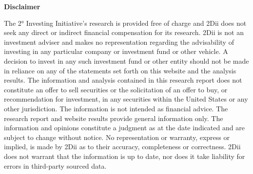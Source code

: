 \documentclass[10pt,table,a4]{article}\usepackage[]{graphicx}\usepackage[]{color}
\begin{document}
\begin{multicols}{2}
		\textbf{Disclaimer}
		
		The 2° Investing Initiative’s research is provided free of charge and 2Dii does not seek any direct or indirect financial compensation for its research. 2Dii is not an investment adviser and makes no representation regarding the advisability of investing in any particular company or investment fund or other vehicle. A decision to invest in any such investment fund or other entity should not be made in reliance on any of the statements set forth on this website and the analysis results. The information and analysis contained in this research report does not constitute an offer to sell securities or the solicitation of an offer to buy, or recommendation for investment, in any securities within the United States or any other jurisdiction. The information is not intended as financial advice. The research report and website results provide general information only. The information and opinions constitute a judgment as at the date indicated and are subject to change without notice. No representation or warranty, express or implied, is made by 2Dii as to their accuracy, completeness or correctness. 2Dii does not warrant that the information is up to date, nor does it take liability for errors in third-party sourced data.
	\end{multicols}
	
	\newpage
	
	
\end{document}

